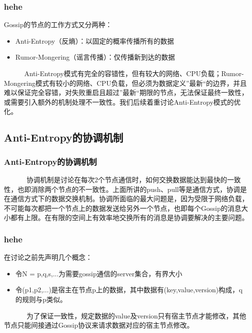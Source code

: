 \documentclass[slidestop,compress,mathserif,c]{beamer}
\begin{document}
\begin{frame}
\frametitle{hehe}
 Gossip的节点的工作方式又分两种：
 \begin{itemize}
 \item Anti-Entropy（反熵）：以固定的概率传播所有的数据
 \item Rumor-Mongering（谣言传播）：仅传播新到达的数据
 \end{itemize}
 ~~~~~~Anti-Entropy模式有完全的容错性，但有较大的网络、CPU负载；Rumor-Mongering模式有较小的网络、CPU负载，但必须为数据定义”最新“的边界，并且难以保证完全容错，对失败重启且超过”最新“期限的节点，无法保证最终一致性，或需要引入额外的机制处理不一致性。我们后续着重讨论Anti-Entropy模式的优化。
\end{frame}

\subsection{\hfill Anti-Entropy的协调机制}
\begin{frame}
\frametitle{Anti-Entropy的协调机制}
~~~~~~ 协调机制是讨论在每次2个节点通信时，如何交换数据能达到最快的一致性，也即消除两个节点的不一致性。上面所讲的push、pull等是通信方式，协调是在通信方式下的数据交换机制。协调所面临的最大问题是，因为受限于网络负载，不可能每次都把一个节点上的数据发送给另外一个节点，也即每个Gossip的消息大小都有上限。在有限的空间上有效率地交换所有的消息是协调要解决的主要问题。
\end{frame}

\begin{frame}
\frametitle{hehe}
 在讨论之前先声明几个概念：
 \begin{itemize}
 \item 令N = {p,q,s,...}为需要gossip通信的server集合，有界大小
 \item 令(p1,p2,...)是宿主在节点p上的数据，其中数据有(key,value,version)构成，q的规则与p类似。
 \end{itemize}
~~~~~~ 为了保证一致性，规定数据的value及version只有宿主节点才能修改，其他节点只能间接通过Gossip协议来请求数据对应的宿主节点修改。
\end{frame}
\end{document}
